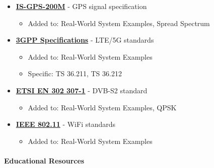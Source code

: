 \begin{itemize}
\tightlist
\item
  \textbf{\href{https://www.gps.gov/technical/icwg/IS-GPS-200M.pdf}{IS-GPS-200M}}
  - GPS signal specification

  \begin{itemize}
  \tightlist
  \item
    Added to: Real-World System Examples, Spread Spectrum
  \end{itemize}
\item
  \textbf{\href{https://www.3gpp.org/ftp/Specs/archive/}{3GPP
  Specifications}} - LTE/5G standards

  \begin{itemize}
  \tightlist
  \item
    Added to: Real-World System Examples
  \item
    Specific: TS 36.211, TS 36.212
  \end{itemize}
\item
  \textbf{\href{https://www.etsi.org/deliver/etsi_en/302300_302399/30230701/}{ETSI
  EN 302 307-1}} - DVB-S2 standard

  \begin{itemize}
  \tightlist
  \item
    Added to: Real-World System Examples, QPSK
  \end{itemize}
\item
  \textbf{\href{https://standards.ieee.org/standard/802_11-2020.html}{IEEE
  802.11}} - WiFi standards

  \begin{itemize}
  \tightlist
  \item
    Added to: Real-World System Examples
  \end{itemize}
\end{itemize}

\paragraph{Educational Resources}\label{educational-resources}

